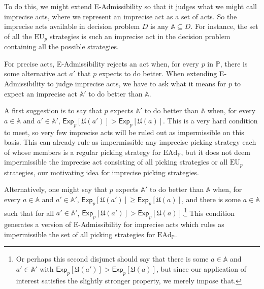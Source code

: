\documentclass[a4paper]{article}
\renewcommand\P{\mathbb{P}} %
\newcommand\Exp{\mathsf{Exp}}
\newcommand\EU{\mathrm{EU}}
\newcommand\EAd{\mathrm{EAd}}
\newcommand\U{\mathfrak{U}} %
\newcommand{\IP}{\P}
\renewcommand{\geq}{\geqslant}
\newenvironment{CCM rewritten}
{\begingroup\color{blue}} %
{\endgroup}              %
\begin{document}
	
	To do this, we might extend E-Admissibility so that it judges what we might call imprecise acts, where we represent an imprecise act as a set of acts. So the imprecise acts available in decision problem $D$ is any $\mathbb{A}\subseteq D$. For instance, the set of all the $\EU_p$ strategies is such an imprecise act in the decision problem containing all the possible strategies.

	


	For precise acts, E-Admissibility rejects an act when, for every $p$ in $\IP$, there is some alternative act $a'$ that $p$ expects to do better. When extending E-Admissibility to judge imprecise acts, we have to ask what it means for $p$ to expect an imprecise act $\mathbb{A}'$ to do better than $\mathbb{A}$. 
	
	A first suggestion is to say that $p$ expects $\mathbb{A}'$ to do better than $\mathbb{A}$ when, for every $a\in\mathbb{A}$ and $a'\in\mathbb{A}'$, $\Exp_p[\U(a')]>\Exp_p[\U(a)]$. This is a very hard condition to meet, so very few imprecise acts will be ruled out as impermissible on this basis. This can already rule as impermissible any imprecise picking strategy each of whose members is a regular picking strategy for $\EAd_\IP$, but it does not deem impermissible the imprecise act consisting of all picking strategies or all $\EU_p$ strategies, our motivating idea for imprecise picking strategies. 
	
	Alternatively, one might say that $p$ expects $\mathbb{A}'$ to do better than $\mathbb{A}$ when, for every $a\in\mathbb{A}$ and $a'\in\mathbb{A}'$, $\Exp_p[\U(a')]\geq\Exp_p[\U(a)]$, and there is some $a\in\mathbb{A}$ such that for all $a'\in\mathbb{A}'$, $\Exp_p[\U(a')]>\Exp_p[\U(a)]$.\footnote{Or perhaps this second disjunct should say that there is some $a\in\mathbb{A}$ and $a'\in\mathbb{A}'$ with $\Exp_p[\U(a')]>\Exp_p[\U(a)]$, but since our application of interest satisfies the slightly stronger property, we merely impose that. }
	This condition generates a version of E-Admissibility for imprecise acts which rules as impermissible the set of all picking strategies for $\EAd_\IP$. 
	
\end{document}

